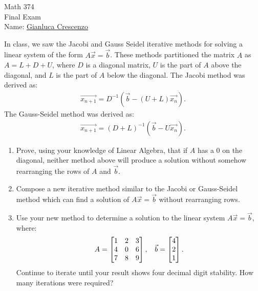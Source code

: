 \documentclass[10pt,twoside,openany]{memoir}
\begin{document}
\begin{center}
{\large Math 374 \\[0.1in]Final Exam \\[0.1in]}
{Name:} {\underline{Gianluca Crescenzo\hspace*{2in}}}\\[0.15in]
\end{center}
\vspace{4pt}
\addtocounter{exercise}{1}
\begin{exercise}
    In class, we saw the Jacobi and Gauss Seidel iterative methods for solving a linear system of the form $A \vec{x} = \vec{b}$. These methods partitioned the matrix $A$ as $A = L + D + U$, where $D$ is a diagonal matrix, $U$ is the part of $A$ above the diagonal, and $L$ is the part of $A$ below the diagonal. The Jacobi method was derived as:
        \begin{equation*}
        \begin{split}
            \overrightarrow{x_{n+1}} = D^{-1} \left( \vec{b} - (U+L) \vec{x_n} \right).
        \end{split}
        \end{equation*}
    The Gauss-Seidel method was derived as:
        \begin{equation*}
        \begin{split}
            \overrightarrow{x_{n+1}} = (D+L)^{-1} \left( \vec{b} - U \vec{x_n} \right).
        \end{split}
        \end{equation*}
\end{exercise}
    \begin{enumerate}[label = (\alph*)]
        \item Prove, using your knowledge of Linear Algebra, that if $A$ has a 0 on the diagonal, neither method above will produce a solution without somehow rearranging the rows of $A$ and $\vec{b}$.
        \item Compose a new iterative method similar to the Jacobi or Gauss-Seidel method which can find a solution of $A\vec{x} = \vec{b}$ without rearranging rows.
        \item Use your new method to determine a solution to the linear system $A\vec{x} = \vec{b}$, where:
        \begin{equation*}
        \begin{split}
            A = \bbmat 1 & 2 & 3 \\ 4 & 0 & 6 \\ 7 & 8 & 9 \ebmat, \h9 \vec{b} = \bbmat 4 \\ 2 \\ 1\ebmat.
        \end{split}
        \end{equation*}
    Continue to iterate until your result shows four decimal digit stability. How many iterations were required?
    \end{enumerate}
\end{document}
